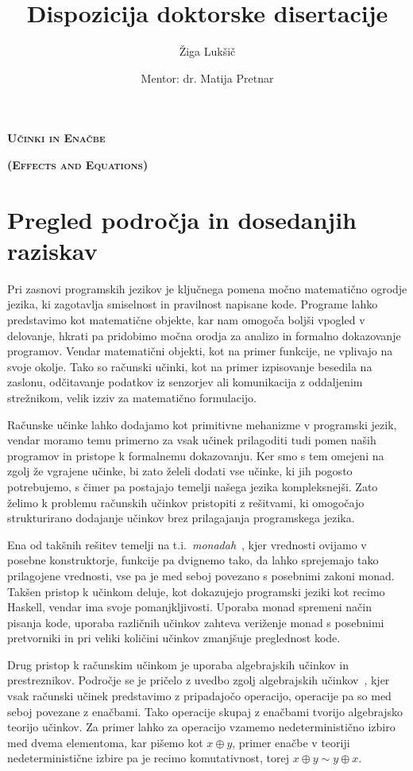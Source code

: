 \documentclass{article}
\title{Dispozicija doktorske disertacije}
\author{Žiga Lukšič \and Mentor: dr. Matija Pretnar}
\date{}
\begin{document}
\maketitle

\vspace{-10mm}
\begin{center}
  \Large{\textsc{\textbf{Učinki in Enačbe}}}

  \Large{\textsc{\textbf{(Effects and Equations)}}}
\end{center}

\section*{Pregled področja in dosedanjih raziskav}

Pri zasnovi programskih jezikov je ključnega pomena močno matematično ogro\-dje jezika, ki zagotavlja smiselnost in pravilnost napisane kode. Programe lahko predstavimo kot matematične objekte, kar nam omogoča boljši vpogled v delovanje, hkrati pa pridobimo močna orodja za analizo in formalno dokazovanje programov.
Vendar matematični objekti, kot na primer funkcije, ne vplivajo na svoje okolje. Tako so računski učinki, kot na primer izpisovanje besedila na zaslonu, odčitavanje podatkov iz senzorjev ali komunikacija z oddaljenim strežnikom, velik izziv za matematično formulacijo.

Računske učinke lahko dodajamo kot primitivne mehanizme v programski jezik, vendar moramo temu primerno za vsak učinek prilagoditi tudi pomen naših programov in pristope k formalnemu dokazovanju. Ker smo s tem omejeni na zgolj že vgrajene učinke, bi zato želeli dodati vse učinke, ki jih pogosto potrebujemo, s čimer pa postajajo temelji našega jezika kompleksnejši. Zato želimo k problemu računskih učinkov pristopiti z rešitvami, ki omogočajo strukturirano dodajanje učinkov brez prilagajanja programskega jezika.

Ena od takšnih rešitev temelji na t.i.\ \emph{monadah}~\cite{DBLP:journals/iandc/Moggi91}, kjer vrednosti ovijamo v posebne konstruktorje, funkcije pa dvignemo tako, da lahko sprejemajo tako prilagojene vrednosti, vse pa je med seboj povezano s posebnimi zakoni monad. Takšen pristop k učinkom deluje, kot dokazujejo programski jeziki kot recimo Haskell, vendar ima svoje pomanjkljivosti. Uporaba monad spremeni način pisanja kode, uporaba različnih učinkov zahteva veriženje monad s posebnimi pretvorniki in pri veliki količini učinkov zmanjšuje preglednost kode.

Drug pristop k računskim učinkom je uporaba algebrajskih učinkov in prestreznikov. Področje se je pričelo z uvedbo zgolj algebrajskih učinkov~\cite{DBLP:conf/fossacs/PlotkinP01, DBLP:journals/acs/PlotkinP03}, kjer vsak računski učinek predstavimo z pripadajočo operacijo, operacije pa so med seboj povezane z enačbami. Tako operacije skupaj z enačbami tvorijo algebrajsko teorijo učinkov. Za primer lahko za operacijo vzamemo nedeterministično izbiro med dvema elementoma, kar pišemo kot $x \oplus y$, primer enačbe v teoriji nedeterministične izbire pa je recimo komutativnost, torej $x \oplus y \sim y \oplus x$.
\end{document}
